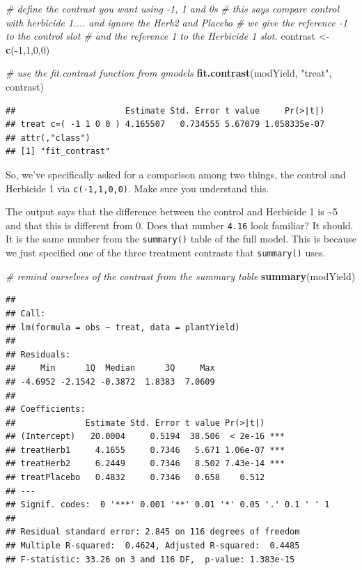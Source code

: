 \documentclass[
]{book}
\newenvironment{Shaded}{\begin{snugshade}}{\end{snugshade}}
\newcommand{\CommentTok}[1]{\textcolor[rgb]{0.56,0.35,0.01}{\textit{#1}}}
\newcommand{\DecValTok}[1]{\textcolor[rgb]{0.00,0.00,0.81}{#1}}
\newcommand{\FunctionTok}[1]{\textcolor[rgb]{0.13,0.29,0.53}{\textbf{#1}}}
\newcommand{\NormalTok}[1]{#1}
\newcommand{\OtherTok}[1]{\textcolor[rgb]{0.56,0.35,0.01}{#1}}
\newcommand{\SpecialCharTok}[1]{\textcolor[rgb]{0.81,0.36,0.00}{\textbf{#1}}}
\newcommand{\StringTok}[1]{\textcolor[rgb]{0.31,0.60,0.02}{#1}}
\begin{document}
\begin{Shaded}
\begin{Highlighting}[]
\CommentTok{\# define the contrast you want using {-}1, 1 and 0\textquotesingle{}s}
\CommentTok{\# this says compare control with herbicide 1.... and ignore the Herb2 and Placebo}
\CommentTok{\# we give the reference {-}1 to the control slot}
\CommentTok{\# and the reference 1 to the Herbicide 1 slot.}
\NormalTok{contrast }\OtherTok{\textless{}{-}} \FunctionTok{c}\NormalTok{(}\SpecialCharTok{{-}}\DecValTok{1}\NormalTok{,}\DecValTok{1}\NormalTok{,}\DecValTok{0}\NormalTok{,}\DecValTok{0}\NormalTok{)}

\CommentTok{\# use the fit.contrast function from gmodels}
\FunctionTok{fit.contrast}\NormalTok{(modYield, }\StringTok{"treat"}\NormalTok{, contrast)}
\end{Highlighting}
\end{Shaded}

\begin{verbatim}
##                      Estimate Std. Error t value     Pr(>|t|)
## treat c=( -1 1 0 0 ) 4.165507   0.734555 5.67079 1.058335e-07
## attr(,"class")
## [1] "fit_contrast"
\end{verbatim}

So, we've specifically asked for a comparison among two things, the control and Herbicide 1 via \texttt{c(-1,1,0,0)}. Make sure you understand this.

The output says that the difference between the control and Herbicide 1 is \textasciitilde5 and that this is different from 0. Does that number \texttt{4.16} look familiar? It should. It is the same number from the \texttt{summary()} table of the full model. This is because we just specified one of the three treatment contrasts that \texttt{summary()} uses.

\begin{Shaded}
\begin{Highlighting}[]
\CommentTok{\# remind ourselves of the contrast from the summary table}
\FunctionTok{summary}\NormalTok{(modYield)}
\end{Highlighting}
\end{Shaded}

\begin{verbatim}
## 
## Call:
## lm(formula = obs ~ treat, data = plantYield)
## 
## Residuals:
##     Min      1Q  Median      3Q     Max 
## -4.6952 -2.1542 -0.3872  1.8383  7.0609 
## 
## Coefficients:
##              Estimate Std. Error t value Pr(>|t|)    
## (Intercept)   20.0004     0.5194  38.506  < 2e-16 ***
## treatHerb1     4.1655     0.7346   5.671 1.06e-07 ***
## treatHerb2     6.2449     0.7346   8.502 7.43e-14 ***
## treatPlacebo   0.4832     0.7346   0.658    0.512    
## ---
## Signif. codes:  0 '***' 0.001 '**' 0.01 '*' 0.05 '.' 0.1 ' ' 1
## 
## Residual standard error: 2.845 on 116 degrees of freedom
## Multiple R-squared:  0.4624, Adjusted R-squared:  0.4485 
## F-statistic: 33.26 on 3 and 116 DF,  p-value: 1.383e-15
\end{verbatim}
\end{document}
